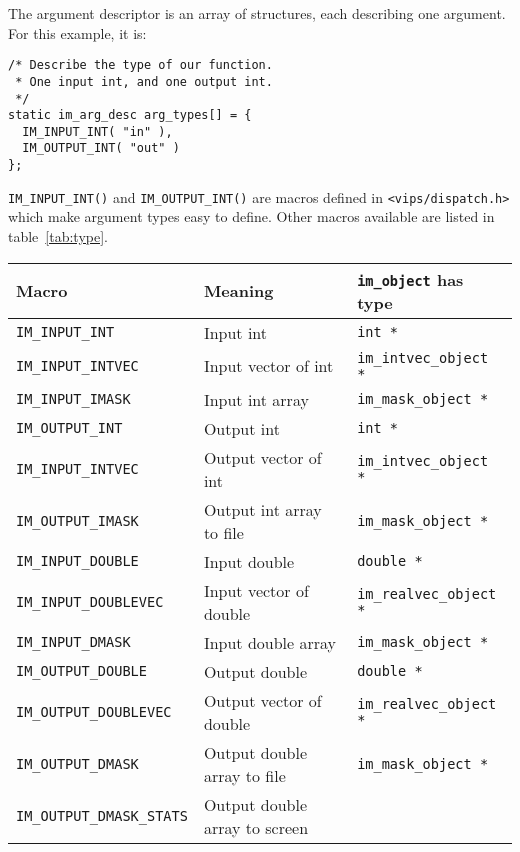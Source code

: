 The argument descriptor is an array of structures, each describing one
argument.  For this example, it is:

\begin{verbatim}
/* Describe the type of our function. 
 * One input int, and one output int.
 */
static im_arg_desc arg_types[] = {
  IM_INPUT_INT( "in" ),
  IM_OUTPUT_INT( "out" )
};
\end{verbatim}

\verb+IM_INPUT_INT()+ and \verb+IM_OUTPUT_INT()+ are macros defined in
\verb+<vips/dispatch.h>+ which make argument types easy to define. Other
macros available are listed in table~\ref{tab:type}.

\begin{tab2}
\begin{center}
\begin{tabular}{|l|l|l|}
\hline
Macro				& Meaning	& 
	\texttt{im\_object} has type \\
\hline
\texttt{IM\_INPUT\_INT} 	& Input int			& 
	\texttt{int *} \\
\texttt{IM\_INPUT\_INTVEC} 	& Input vector of int		& 
	\texttt{im\_intvec\_object *} \\
\texttt{IM\_INPUT\_IMASK}	& Input int array		& 
	\texttt{im\_mask\_object *} \\

\texttt{IM\_OUTPUT\_INT} 	& Output int			& 
	\texttt{int *} \\
\texttt{IM\_INPUT\_INTVEC} 	& Output vector of int		& 
	\texttt{im\_intvec\_object *} \\
\texttt{IM\_OUTPUT\_IMASK}	& Output int array to file	& 
	\texttt{im\_mask\_object *} \\

\texttt{IM\_INPUT\_DOUBLE} 	& Input double			& 
	\texttt{double *} \\
\texttt{IM\_INPUT\_DOUBLEVEC} 	& Input vector of double	& 
	\texttt{im\_realvec\_object *} \\
\texttt{IM\_INPUT\_DMASK} 	& Input double array		& 
	\texttt{im\_mask\_object *} \\

\texttt{IM\_OUTPUT\_DOUBLE}	& Output double			& 
	\texttt{double *} \\
\texttt{IM\_OUTPUT\_DOUBLEVEC} 	& Output vector of double	& 
	\texttt{im\_realvec\_object *} \\
\texttt{IM\_OUTPUT\_DMASK}	& Output double array to file	& 
	\texttt{im\_mask\_object *} \\
\texttt{IM\_OUTPUT\_DMASK\_STATS}& Output double array to screen & 
	\\


\end{tabular}
\end{center}
\end{tab2}
